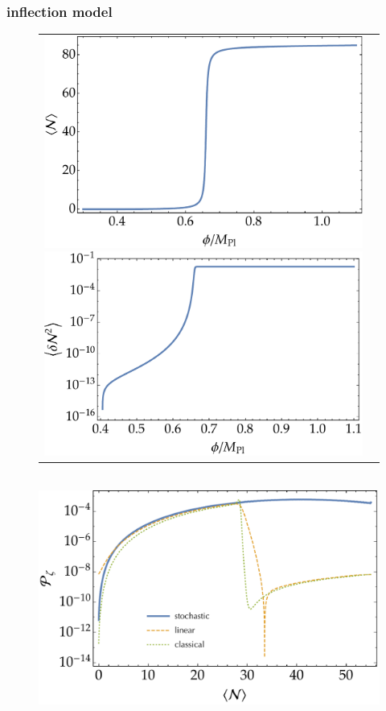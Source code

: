 \documentclass[aps, prd
, preprint
, nofootinbib 
, longbibliography
]{revtex4-1}
\begin{document}
\subsubsection{inflection model}

\begin{figure}
	\centering
	\begin{tabular}{cc}
		\begin{minipage}{0.5\hsize}
			\centering
			\includegraphics[width=0.9\hsize]{figs/inflection/N_conf.pdf}
		\end{minipage}
		\begin{minipage}{0.5\hsize}
			\centering
			\includegraphics[width=0.9\hsize]{figs/inflection/dN2_conf.pdf}
		\end{minipage}
	\end{tabular} \\[10pt]
	\includegraphics[width=0.5\hsize]{figs/inflection/Pzeta_conf.pdf}
	\caption{}
	\label{figs: inflection_conf}
\end{figure}
\end{document}
